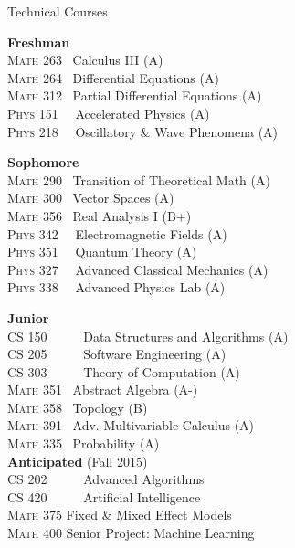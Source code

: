 \documentclass{resume} %
\begin{document}
\begin{rSection}{Technical Courses}


\setlength{\columnsep}{1cm}
\begin{multicols}{2}

\textbf{Freshman}\\
\textsc{Math 263} 	 \	Calculus III (A)\\
\textsc{Math 264} 	 \	Differential Equations (A)\\
\textsc{Math 312} 	 \	Partial Differential Equations (A)\\
\textsc{Phys 151} \  \	Accelerated Physics (A)\\
\textsc{Phys 218} \  \	Oscillatory \& Wave Phenomena (A)

\textbf{Sophomore}\\
\textsc{Math 290} 	 \	Transition of Theoretical Math (A)\\
\textsc{Math 300} 	 \	Vector Spaces (A)\\
\textsc{Math 356} 	 \	Real Analysis I (B+)\\
\textsc{Phys 342} \	 \	Electromagnetic Fields (A)\\
\textsc{Phys 351} \	 \	Quantum Theory (A)\\
\textsc{Phys 327} \	 \	Advanced Classical Mechanics (A)\\
\textsc{Phys 338} \	 \	Advanced Physics Lab (A)

\textbf{Junior}\\
\textsc{CS 150} \ \ \ \  \	Data Structures and Algorithms (A)\\
\textsc{CS 205} \ \ \ \	 \	Software Engineering (A)\\
\textsc{CS 303} \ \ \ \	 \	Theory of Computation (A)\\
\textsc{Math 351} 		 \	Abstract Algebra (A-)\\
\textsc{Math 358} 		 \	Topology (B)\\
\textsc{Math 391} 		 \	Adv. Multivariable Calculus (A)\\
\textsc{Math 335} 		 \	Probability (A)\\

\textbf{Anticipated} (Fall 2015)\\
\textsc{CS 202} \ \ \ \	 \	Advanced Algorithms\\
\textsc{CS 420} \ \ \ \	 \	Artificial Intelligence\\
\textsc{Math 375} 		 Fixed \& Mixed Effect Models\\
\textsc{Math 400} 		 Senior Project: Machine Learning\\


\end{multicols}

\end{rSection}
\end{document}
